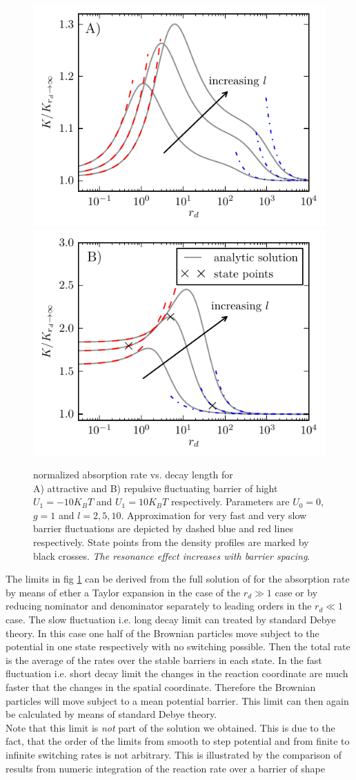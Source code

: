 \documentclass[twocolumn,superscriptaddress]{revtex4}
\begin{document}
\begin{figure}[H]
\includegraphics[width= .5 \textwidth]{plots/l_ab_rates.pdf}
\includegraphics[width= .5 \textwidth]{plots/l_rb_rates.pdf}
\caption{normalized absorption rate vs. decay length for \\ A) attractive and B) repulsive fluctuating barrier of hight $U_1=-10 K_B T$ and $U_1=10 K_B T$ respectively. \newline Parameters are $U_0= 0$, $g = 1$ and $l=2,5,10$. Approximation for very fast and very slow barrier fluctuations are depicted by dashed blue and red lines respectively. State points from the density profiles are marked by black crosses. \emph{The resonance effect increases with barrier spacing}.}
\label{fig3}
\end{figure}
The limits in fig \ref{fig3} can be derived from the full solution of for the absorption rate by means of ether a Taylor expansion in the case of the $r_d \gg 1$ case or by reducing nominator and denominator separately to leading orders in the $r_d \ll 1$ case. The slow fluctuation i.e. long decay limit can treated by standard Debye theory. In this case one half of the Brownian particles move subject to the potential in one state respectively with no switching possible. Then the total rate is the average of the rates over the stable barriers in each state. In the fast fluctuation i.e. short decay limit the changes in the reaction coordinate are much faster that the changes in the spatial coordinate. Therefore the Brownian particles will move subject to a mean potential barrier. This limit can then again be calculated by means of standard Debye theory.\\ Note that this limit is \emph{not} part of the solution we obtained. This is due to the fact, that the order of the limits from smooth to step potential and from finite to infinite switching rates is not arbitrary. This is illustrated by the comparison of results from numeric integration of the reaction rate over a barrier of shape
\end{document}
